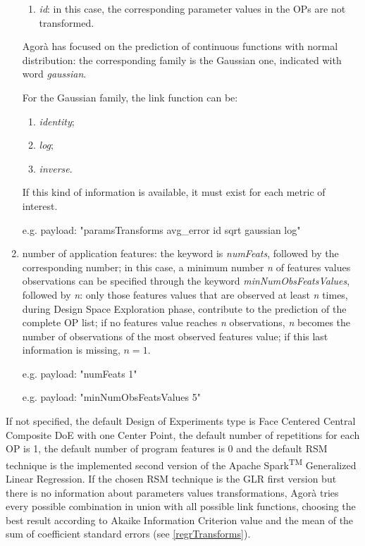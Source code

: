 \begin{enumerate}
\begin{enumerate}
        \item \textit{id}: in this case, the corresponding parameter values in the OPs are not transformed.
    
    \end{enumerate}
    
    Agorà has focused on the prediction of continuous functions with normal distribution: the corresponding family is the Gaussian one, indicated with word \textit{gaussian}.
    
    For the Gaussian family, the link function can be:
    
    \begin{enumerate}
    
        \item \textit{identity};
        
        \item \textit{log};
        
        \item \textit{inverse}.
    
    \end{enumerate}
    
    If this kind of information is available, it must exist for each metric of interest.
    
    e.g. payload: "paramsTransforms avg\_error id sqrt gaussian log"
    
    \item number of application features: the keyword is \textit{numFeats}, followed by the corresponding number; in this case, a minimum number \textit{n} of features values observations can be specified through the keyword \textit{minNumObsFeatsValues}, followed by \textit{n}: only those features values that are observed at least \textit{n} times, during Design Space Exploration phase, contribute to the prediction of the complete OP list; if no features value reaches \textit{n} observations, \textit{n} becomes the number of observations of the most observed features value; if this last information is missing, $n = 1$.
    
    e.g. payload: "numFeats 1"
    
    e.g. payload: "minNumObsFeatsValues 5"

\end{enumerate}

If not specified, the default Design of Experiments type is Face Centered Central Composite DoE with one Center Point, the default number of repetitions for each OP is 1, the default number of program features is 0 and the default RSM technique is the implemented second version of the Apache Spark\textsuperscript{TM} Generalized Linear Regression. If the chosen RSM technique is the GLR first version but there is no information about parameters values transformations, Agorà tries every possible combination in union with all possible link functions, choosing the best result according to Akaike Information Criterion value and the mean of the sum of coefficient standard errors (see \ref{regrTransforms}).

